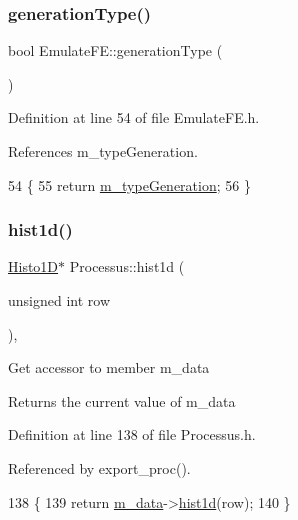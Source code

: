 \subsubsection{\texorpdfstring{generation\+Type()}{generationType()}}
{\footnotesize\ttfamily bool Emulate\+F\+E\+::generation\+Type (\begin{DoxyParamCaption}{ }\end{DoxyParamCaption})\hspace{0.3cm}{\ttfamily [inline]}}



Definition at line 54 of file Emulate\+F\+E.\+h.



References m\+\_\+type\+Generation.


\begin{DoxyCode}
54                        \{
55     \textcolor{keywordflow}{return} \hyperlink{classEmulateFE_aa8bd0aa42cc5f3d52930408807b3067c}{m\_typeGeneration};
56   \}
\end{DoxyCode}
\mbox{\label{classProcessus_a409227db936baff03c0462c1bcfe8069}} 
\subsubsection{\texorpdfstring{hist1d()}{hist1d()}}
{\footnotesize\ttfamily \hyperlink{classHisto1D}{Histo1D}$\ast$ Processus\+::hist1d (\begin{DoxyParamCaption}\item[{unsigned int}]{row }\end{DoxyParamCaption})\hspace{0.3cm}{\ttfamily [inline]}, {\ttfamily [inherited]}}

Get accessor to member m\+\_\+data \begin{DoxyReturn}{Returns}
the current value of m\+\_\+data 
\end{DoxyReturn}


Definition at line 138 of file Processus.\+h.



Referenced by export\+\_\+proc().


\begin{DoxyCode}
138                                    \{
139     \textcolor{keywordflow}{return} \hyperlink{classProcessus_a3da9a9de8af54e2f47807a3e09dfccff}{m\_data}->\hyperlink{classData_a476a66728ccfc553909d15b36c22492a}{hist1d}(row);
140   \}
\end{DoxyCode}
\mbox{\label{classProcessus_a73b5118cb5f2b5eaad33286183b86cfc}} 
